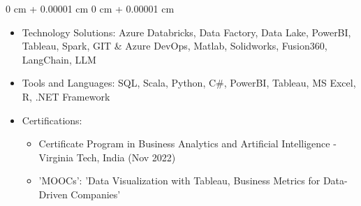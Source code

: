 \documentclass[10pt, letterpaper]{article}
\newenvironment{onecolentry}{
    \begin{adjustwidth}{
        0 cm + 0.00001 cm
    }{
        0 cm + 0.00001 cm
    }
  }{
      \end{adjustwidth}
  } %
\begin{document}
    \begin{onecolentry}
    \begin{itemize}
        
        \item Technology Solutions: Azure Databricks, Data Factory, Data Lake, PowerBI, Tableau, Spark, GIT \& Azure DevOps, Matlab, Solidworks, Fusion360, LangChain, LLM
        
        
        \item Tools and Languages: SQL, Scala, Python, C\#, PowerBI, Tableau, MS Excel, R, .NET Framework
        
        
        \item Certifications:
        \begin{itemize}
            
            \item Certificate Program in Business Analytics and Artificial Intelligence - Virginia Tech, India (Nov 2022)
            
            \item {'MOOCs': 'Data Visualization with Tableau, Business Metrics for Data-Driven Companies'}
            
        \end{itemize}
        
    \end{itemize}
    \end{onecolentry}



  


    
  
  
\end{document}
